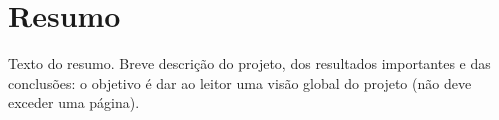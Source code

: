 \documentclass[a4paper,openright,twoside,11pt]{report}
\begin{document}
\cleardoublepage
\chapter*{Resumo}
Texto do resumo.
Breve descrição do projeto, dos resultados importantes e das conclusões: o objetivo é dar ao leitor uma visão global do projeto (não deve exceder uma página).



\cleardoublepage
\tableofcontents \cleardoublepage


\setcounter{page}{1}


















\end{document}
